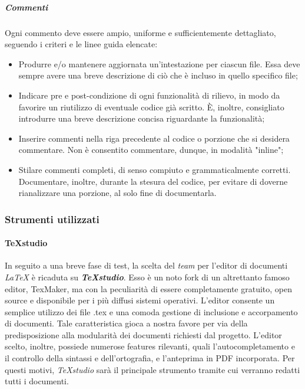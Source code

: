 			\subparagraph{Commenti}
			Ogni commento deve essere ampio, uniforme e sufficientemente dettagliato, seguendo i criteri e le linee guida elencate:
			\begin{itemize}
			\item Produrre e/o mantenere aggiornata un'intestazione per ciascun file. Essa deve sempre avere una breve descrizione di ciò che è incluso in quello specifico file;
			\item Indicare pre e post-condizione di ogni funzionalità di rilievo, in modo da favorire un riutilizzo di eventuale codice già scritto. \MakeUppercase{è}, inoltre, consigliato introdurre una breve descrizione concisa riguardante la funzionalità;
			\item Inserire commenti nella riga precedente al codice o porzione che si desidera commentare. Non è consentito commentare, dunque, in modalità "inline";
			\item Stilare commenti completi, di senso compiuto e grammaticalmente corretti. Documentare, inoltre, durante la stesura del codice, per evitare di doverne rianalizzare una porzione, al solo fine di documentarla.
			\end{itemize}
		
	\subsubsection{Strumenti utilizzati}
	
		\paragraph{TeXstudio}
		In seguito a una breve fase di test, la scelta del \textit{team} per l'editor di documenti \textit{\LaTeX{}} è ricaduta su \textit{\textbf{TeXstudio}}. Esso è un noto fork di un altrettanto famoso editor, TexMaker, ma con la peculiarità di essere completamente gratuito, open source e disponibile per i più diffusi sistemi operativi. L'editor consente un semplice utilizzo dei file .tex e una comoda gestione di inclusione e accorpamento di documenti. Tale caratteristica gioca a nostra favore per via della predisposizione alla modularità dei documenti richiesti dal progetto. L'editor scelto, inoltre, possiede numerose features rilevanti, quali l'autocompletamento e il controllo della sintassi e dell'ortografia, e l'anteprima in PDF incorporata. Per questi motivi, \textit{TeXstudio} sarà il principale strumento tramite cui verranno redatti tutti i documenti.
	
